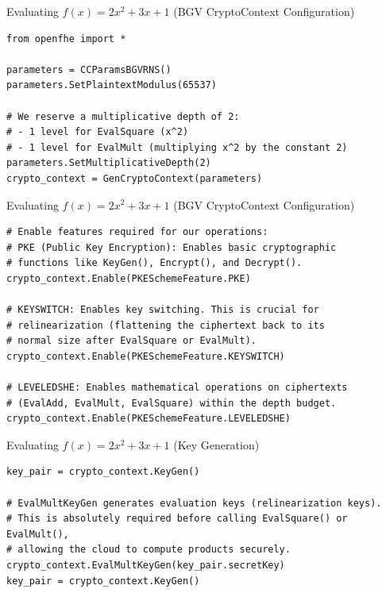 \documentclass[aspectratio=169, 10pt]{beamer}
\begin{document}
\begin{frame}[fragile]{Evaluating $f(x) = 2x^2 + 3x + 1$ (BGV CryptoContext Configuration)}
\vspace{0.1cm}
\begin{lstlisting}[firstnumber=1]
from openfhe import *

parameters = CCParamsBGVRNS()
parameters.SetPlaintextModulus(65537)
    
# We reserve a multiplicative depth of 2:
# - 1 level for EvalSquare (x^2)
# - 1 level for EvalMult (multiplying x^2 by the constant 2)
parameters.SetMultiplicativeDepth(2) 
crypto_context = GenCryptoContext(parameters)
\end{lstlisting}
\end{frame}

\begin{frame}[fragile]{Evaluating $f(x) = 2x^2 + 3x + 1$ (BGV CryptoContext Configuration)}
\vspace{0.1cm}
\begin{lstlisting}[firstnumber=11]
# Enable features required for our operations:
# PKE (Public Key Encryption): Enables basic cryptographic 
# functions like KeyGen(), Encrypt(), and Decrypt().
crypto_context.Enable(PKESchemeFeature.PKE)
    
# KEYSWITCH: Enables key switching. This is crucial for 
# relinearization (flattening the ciphertext back to its 
# normal size after EvalSquare or EvalMult).
crypto_context.Enable(PKESchemeFeature.KEYSWITCH)
    
# LEVELEDSHE: Enables mathematical operations on ciphertexts 
# (EvalAdd, EvalMult, EvalSquare) within the depth budget.
crypto_context.Enable(PKESchemeFeature.LEVELEDSHE)
\end{lstlisting}
\end{frame}

\begin{frame}[fragile]{Evaluating $f(x) = 2x^2 + 3x + 1$ (Key Generation)}
\vspace{0.1cm}
\begin{lstlisting}[firstnumber=24]
key_pair = crypto_context.KeyGen()
    
# EvalMultKeyGen generates evaluation keys (relinearization keys).
# This is absolutely required before calling EvalSquare() or EvalMult(), 
# allowing the cloud to compute products securely.
crypto_context.EvalMultKeyGen(key_pair.secretKey)
key_pair = crypto_context.KeyGen()
\end{lstlisting}
\end{frame}
\end{document}
